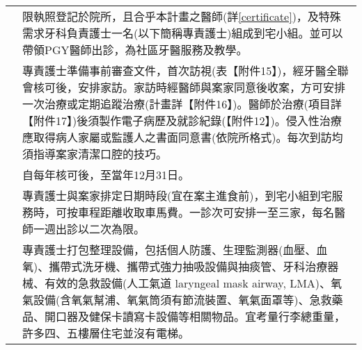 \begin{longtable}{p{1.3in}p{4.8in}}

\color{OliveGreen}{人力須求}
 & 限執照登記於院所，且合乎本計畫之醫師(詳\ref{certificate})，及特殊需求牙科負責護士一名(以下簡稱專責護士)組成到宅小組。並可以帶領PGY醫師出診，為社區牙醫服務及教學。\\
 
\color{OliveGreen}{服務內容}
 & 專責護士準備事前審查文件，首次訪視(表【附件15】)，經牙醫全聯會核可後，安排家訪。家訪時經醫師與案家同意後收案，方可安排一次治療或定期追蹤治療(計畫詳【附件16】)。醫師於治療(項目詳【附件17】)後須製作電子病歷及就診紀錄(【附件12】)。侵入性治療應取得病人家屬或監護人之書面同意書(依院所格式)。每次到訪均須指導案家清潔口腔的技巧。\\

\color{OliveGreen}{計畫期程}
& 自每年核可後，至當年12月31日。\\
 
\color{OliveGreen}{服務場所}
& 專責護士與案家排定日期時段(宜在案主進食前)，到宅小組到宅服務時，可按車程距離收取車馬費。一診次可安排一至三家，每名醫師一週出診以二次為限。\\

\color{OliveGreen}{設備須求(詳【附件19】)} %
& 專責護士打包整理設備，包括個人防護、生理監測器(血壓、血氧)、攜帶式洗牙機、攜帶式強力抽吸設備與抽痰管、牙科治療器械、有效的急救設備(人工氣道 laryngeal mask airway, LMA)、氧氣設備(含氧氣幫浦、氧氣筒須有節流裝置、氧氣面罩等)、急救藥品、開口器及健保卡讀寫卡設備等相關物品。宜考量行李總重量，許多四、五樓層住宅並沒有電梯。\\



\end{longtable}
